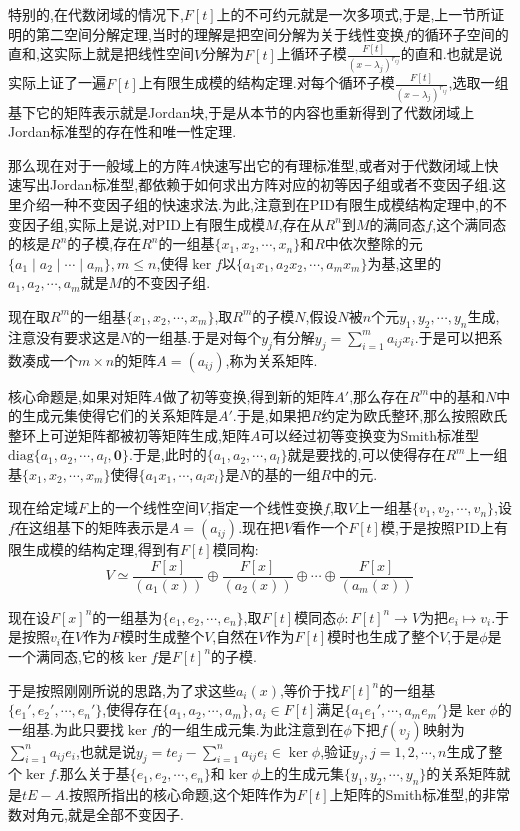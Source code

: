 特别的,在代数闭域的情况下,$F[t]$上的不可约元就是一次多项式,于是,上一节所证明的第二空间分解定理,当时的理解是把空间分解为关于线性变换$f$的循环子空间的直和,这实际上就是把线性空间$V$分解为$F[t]$上循环子模$\frac{F[t]}{(x-\lambda_j)^{r_{ij}}}$的直和.也就是说实际上证了一遍$F[t]$上有限生成模的结构定理.对每个循环子模$\frac{F[t]}{(x-\lambda_j)^{r_{ij}}}$,选取一组基下它的矩阵表示就是Jordan块,于是从本节的内容也重新得到了代数闭域上Jordan标准型的存在性和唯一性定理.

那么现在对于一般域上的方阵$A$快速写出它的有理标准型,或者对于代数闭域上快速写出Jordan标准型,都依赖于如何求出方阵对应的初等因子组或者不变因子组.这里介绍一种不变因子组的快速求法.为此,注意到在PID有限生成模结构定理中,的不变因子组,实际上是说,对PID上有限生成模$M$,存在从$R^n$到$M$的满同态$f$,这个满同态的核是$R^n$的子模,存在$R^n$的一组基$\{x_1,x_2,\cdots,x_n\}$和$R$中依次整除的元$\{a_1\mid a_2\mid\cdots\mid a_m\},m\le n$,使得$\ker f$以$\{a_1x_1,a_2x_2,\cdots,a_mx_m\}$为基,这里的$a_1,a_2,\cdots,a_m$就是$M$的不变因子组.

现在取$R^m$的一组基$\{x_1,x_2,\cdots,x_m\}$,取$R^m$的子模$N$,假设$N$被$n$个元$y_1,y_2,\cdots,y_n$生成,注意没有要求这是$N$的一组基.于是对每个$y_j$有分解$y_j=\sum_{i=1}^{m}a_{ij}x_i$.于是可以把系数凑成一个$m\times n$的矩阵$A=(a_{ij})$,称为关系矩阵.

核心命题是,如果对矩阵$A$做了初等变换,得到新的矩阵$A'$,那么存在$R^m$中的基和$N$中的生成元集使得它们的关系矩阵是$A'$.于是,如果把$R$约定为欧氏整环,那么按照欧氏整环上可逆矩阵都被初等矩阵生成,矩阵$A$可以经过初等变换变为Smith标准型$\mathrm{diag}\{a_1,a_2,\cdots,a_l,\textbf{0}\}$.于是,此时的$\{a_1,a_2,\cdots,a_l\}$就是要找的,可以使得存在$R^m$上一组基$\{x_1,x_2,\cdots,x_m\}$使得$\{a_1x_1,\cdots,a_lx_l\}$是$N$的基的一组$R$中的元.

现在给定域$F$上的一个线性空间$V$,指定一个线性变换$f$,取$V$上一组基$\{v_1,v_2,\cdots,v_n\}$,设$f$在这组基下的矩阵表示是$A=(a_{ij})$.现在把$V$看作一个$F[t]$模,于是按照PID上有限生成模的结构定理,得到有$F[t]$模同构:
$$V\simeq\frac{F[x]}{(a_1(x))}\oplus \frac{F[x]}{(a_2(x))}\oplus\cdots\oplus\frac{F[x]}{(a_m(x))}$$

现在设$F[x]^n$的一组基为$\{e_1,e_2,\cdots,e_n\}$,取$F[t]$模同态$\phi:F[t]^n\to V$为把$e_i\mapsto v_i$.于是按照$v_i$在$V$作为$F$模时生成整个$V$,自然在$V$作为$F[t]$模时也生成了整个$V$,于是$\phi$是一个满同态,它的核$\ker f$是$F[t]^n$的子模.

于是按照刚刚所说的思路,为了求这些$a_i(x)$,等价于找$F[t]^n$的一组基$\{e_1',e_2',\cdots,e_n'\}$,使得存在$\{a_1,a_2,\cdots,a_m\},a_i\in F[t]$满足$\{a_1e_1',\cdots,a_me_m'\}$是$\ker\phi$的一组基.为此只要找$\ker f$的一组生成元集.为此注意到在$\phi$下把$f(v_j)$映射为$\sum_{i=1}^{n}a_{ij}e_i$,也就是说$y_j=te_j-\sum_{i=1}^{n}a_{ij}e_i\in\ker\phi$,验证$y_j,j=1,2,\cdots,n$生成了整个$\ker f$.那么关于基$\{e_1,e_2,\cdots,e_n\}$和$\ker\phi$上的生成元集$\{y_1,y_2,\cdots,y_n\}$的关系矩阵就是$tE-A$.按照所指出的核心命题,这个矩阵作为$F[t]$上矩阵的Smith标准型,的非常数对角元,就是全部不变因子.

